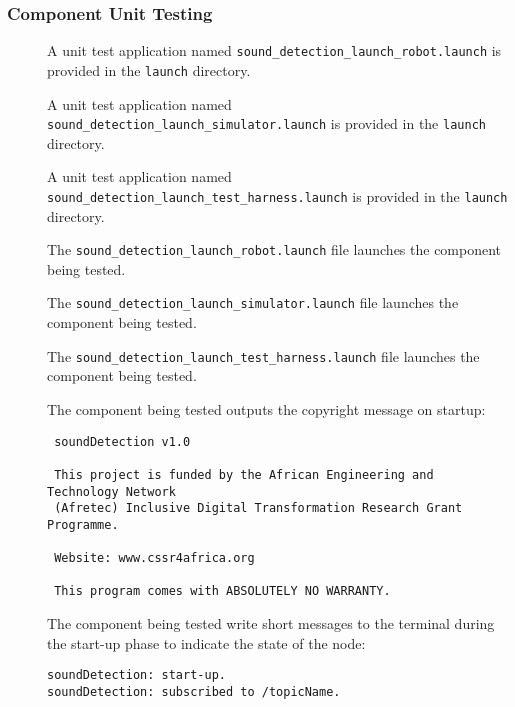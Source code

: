 \documentclass{CSSRforAfrica}
\newcommand{\checkboxChecked}{\fbox{\ding{51}}} %
\newcommand{\checkboxDashed}{\fbox{--}}         %
\begin{document}
\subsubsection{Component Unit Testing}
\label{subsubsection:sound_detection_unit_testing}

\begin{description}

\item[\checkboxDashed] A unit test application named {\small \verb+sound_detection_launch_robot.launch+} is provided in the {\small \verb+launch+} directory.

\item[\checkboxDashed] A unit test application named {\small \verb+sound_detection_launch_simulator.launch+} is provided in the {\small \verb+launch+} directory.

\item[\checkboxDashed] A unit test application named {\small \verb+sound_detection_launch_test_harness.launch+} is provided in the {\small \verb+launch+} directory.

\item[\checkboxDashed] The {\small \verb+sound_detection_launch_robot.launch+} file launches the component being tested.

\item[\checkboxDashed] The {\small \verb+sound_detection_launch_simulator.launch+} file launches the component being tested.

\item[\checkboxDashed] The {\small \verb+sound_detection_launch_test_harness.launch+} file launches the component being tested.

\item[\checkboxChecked] The component being tested outputs the copyright message on startup:
{\small 
\begin{verbatim}
 soundDetection v1.0
 
 This project is funded by the African Engineering and Technology Network 
 (Afretec) Inclusive Digital Transformation Research Grant Programme.
 
 Website: www.cssr4africa.org
 
 This program comes with ABSOLUTELY NO WARRANTY.
\end{verbatim}}

\newpage
\item[\checkboxChecked]  The component being tested write short messages to the terminal during the start-up phase to indicate the state of the node:
{\small 
\begin{verbatim}
soundDetection: start-up.
soundDetection: subscribed to /topicName.
\end{verbatim}}


\end{description}
\end{document}
